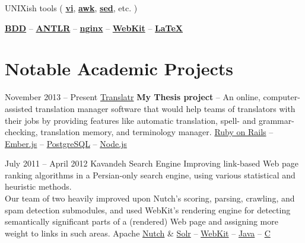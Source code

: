 \documentclass{tccv}
\newcommand{\plus}{\raisebox{.1\height}{\scalebox{.8}{+}}}
\begin{document}
{{\hspace{2pt}%
UNIXish tools (%
	\href{http://www.vim.org}{\bf vi}, %
	\href{http://awk.info}{\bf awk}, %
	\href{http://www.gnu.org/software/sed/}{\bf sed}, etc.%
)%

\hspace{2pt}%
	\href{http://en.wikipedia.org/wiki/Behavior-driven_development}{\bf BDD} -- %
	\href{http://www.antlr.org}{\bf ANTLR} -- %
	\href{http://nginx.org/en/}{\bf nginx} -- %
	\href{http://www.webkit.org}{\bf WebKit} -- %
	\href{http://www.latex-project.org}{\bf \LaTeX}




\newpage





\section{Notable Academic Projects}

\begin{project_list}

\vspace{7pt}

\item{November 2013 -- Present}
     {}
     {\vspace{-14pt}\href{https://github.com/pooriaazimi/Translatr}{Translatr}}
	 {{\bf My Thesis project} -- An online, computer-assisted \mbox{translation} manager software that would help teams of translators with their jobs by providing features like auto\-matic translation, spell- and grammar-checking, translation memory, and terminology manager.}
     {%
     	\href{http://rubyonrails.org}{Ruby on Rails} -- %
		\href{http://emberjs.com}{Ember.js} -- %
		\href{http://www.postgresql.org}{PostgreSQL} -- %
		\href{http://nodejs.org}{Node.js}%
	}
		
	
\vspace{-6pt}

\item{July 2011 -- April 2012}
     {}
     {Kavandeh Search Engine}
	 {Improving link-based Web page ranking algorithms in a Persian-only search engine, using various statistical and heuristic methods.
	 \\[1.5pt]
	 Our team of two heavily improved upon Nutch's \mbox{scoring}, parsing, crawling, and spam detection submodules, and used WebKit's rendering engine for detecting \mbox{semantically} significant parts of a (rendered) Web page and \mbox{assigning} more weight to links in such areas.}
     {%
     	Apache \href{http://nutch.apache.org}{Nutch} \&
		\href{http://lucene.apache.org/solr/}{Solr} -- %
		\href{http://www.webkit.org}{WebKit} -- %
		\href{http://www.oracle.com/technetwork/java/}{Java} -- %
		\href{https://en.wikipedia.org/wiki/C\%2B\%2B}{C\plus\plus}%
	}


\end{project_list}}}
\end{document}
